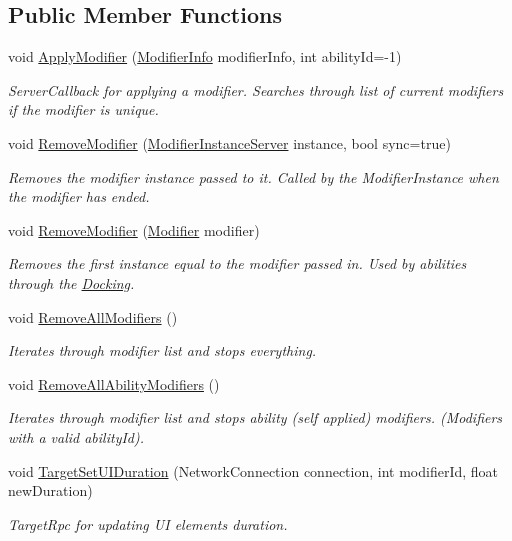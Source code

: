 \subsection*{Public Member Functions}
\begin{DoxyCompactItemize}
\item 
void \hyperlink{class_player_status_ab8756b7695fdb92d6e1bfb41136e9e64}{Apply\+Modifier} (\hyperlink{struct_modifier_info}{Modifier\+Info} modifier\+Info, int ability\+Id=-\/1)
\begin{DoxyCompactList}\small\item\em Server\+Callback for applying a modifier. Searches through list of current modifiers if the modifier is unique. \end{DoxyCompactList}\item 
void \hyperlink{class_player_status_a8be77a700782937b7e3a65c00e33ef2c}{Remove\+Modifier} (\hyperlink{class_modifier_instance_server}{Modifier\+Instance\+Server} instance, bool sync=true)
\begin{DoxyCompactList}\small\item\em Removes the modifier instance passed to it. Called by the Modifier\+Instance when the modifier has ended. \end{DoxyCompactList}\item 
void \hyperlink{class_player_status_a04fbcb133455c0416c9fd7e7dbc974e2}{Remove\+Modifier} (\hyperlink{class_modifier}{Modifier} modifier)
\begin{DoxyCompactList}\small\item\em Removes the first instance equal to the modifier passed in. Used by abilities through the \hyperlink{class_docking}{Docking}. \end{DoxyCompactList}\item 
void \hyperlink{class_player_status_a72dff84382f4ede50e529a80e44c98ac}{Remove\+All\+Modifiers} ()
\begin{DoxyCompactList}\small\item\em Iterates through modifier list and stops everything. \end{DoxyCompactList}\item 
void \hyperlink{class_player_status_af6f61e3ea4794da66e0df905ec02ccf7}{Remove\+All\+Ability\+Modifiers} ()
\begin{DoxyCompactList}\small\item\em Iterates through modifier list and stops ability (self applied) modifiers. (Modifiers with a valid ability\+Id). \end{DoxyCompactList}\item 
void \hyperlink{class_player_status_a35a67a9226a36c964004b7feb0fa8dd1}{Target\+Set\+U\+I\+Duration} (Network\+Connection connection, int modifier\+Id, float new\+Duration)
\begin{DoxyCompactList}\small\item\em Target\+Rpc for updating UI elements duration. \end{DoxyCompactList}\end{DoxyCompactItemize}
